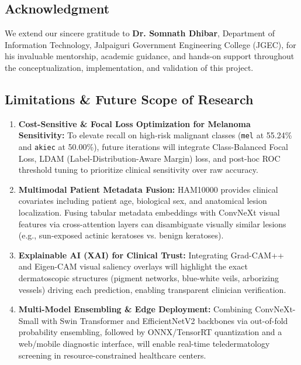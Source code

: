 \documentclass[12pt,a4paper]{article}
\begin{document}
\subsection{Acknowledgment}
We extend our sincere gratitude to \textbf{Dr. Somnath Dhibar}, Department of Information Technology, Jalpaiguri Government Engineering College (JGEC), for his invaluable mentorship, academic guidance, and hands-on support throughout the conceptualization, implementation, and validation of this project.

\subsection{Limitations \& Future Scope of Research}
\begin{enumerate}[leftmargin=*]
    \item \textbf{Cost-Sensitive \& Focal Loss Optimization for Melanoma Sensitivity:} To elevate recall on high-risk malignant classes (\texttt{mel} at 55.24\% and \texttt{akiec} at 50.00\%), future iterations will integrate Class-Balanced Focal Loss, LDAM (Label-Distribution-Aware Margin) loss, and post-hoc ROC threshold tuning to prioritize clinical sensitivity over raw accuracy.
    \item \textbf{Multimodal Patient Metadata Fusion:} HAM10000 provides clinical covariates including patient age, biological sex, and anatomical lesion localization. Fusing tabular metadata embeddings with ConvNeXt visual features via cross-attention layers can disambiguate visually similar lesions (e.g., sun-exposed actinic keratoses vs. benign keratoses).
    \item \textbf{Explainable AI (XAI) for Clinical Trust:} Integrating Grad-CAM++ and Eigen-CAM visual saliency overlays will highlight the exact dermatoscopic structures (pigment networks, blue-white veils, arborizing vessels) driving each prediction, enabling transparent clinician verification.
    \item \textbf{Multi-Model Ensembling \& Edge Deployment:} Combining ConvNeXt-Small with Swin Transformer and EfficientNetV2 backbones via out-of-fold probability ensembling, followed by ONNX/TensorRT quantization and a web/mobile diagnostic interface, will enable real-time teledermatology screening in resource-constrained healthcare centers.
\end{enumerate}
\end{document}
